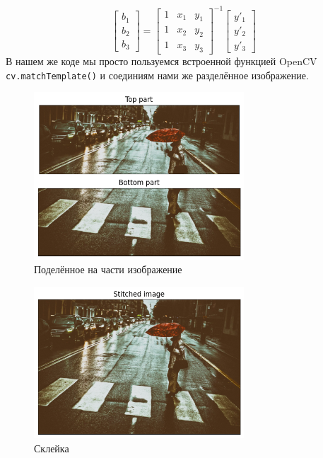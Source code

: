 \documentclass[a4paper,12pt]{article}
\begin{document}
$$
	\begin{bmatrix}
		b_1  \\ b_2 \\ b_3
	\end{bmatrix}
	=
	\begin{bmatrix}
		1 & x_1 & y_1
		\\ 1 & x_2 & y_2
		\\ 1 & x_3 & y_3
	\end{bmatrix}^{-1}
	\begin{bmatrix}
		y'_1  \\ y'_2 \\ y'_3
	\end{bmatrix}
$$
В нашем же коде мы просто пользуемся встроенной функцией OpenCV  \texttt{cv.matchTemplate()} и соединиям нами же разделённое изображение.
\begin{figure}[H]
    \centering \includegraphics[width=0.7\textwidth]{my_images/44.png}
    \caption{Поделённое на части изображение}
\end{figure}
\begin{figure}[H]
    \centering \includegraphics[width=0.7\textwidth]{my_images/45.png}
    \caption{Склейка}
\end{figure}
\end{document}
